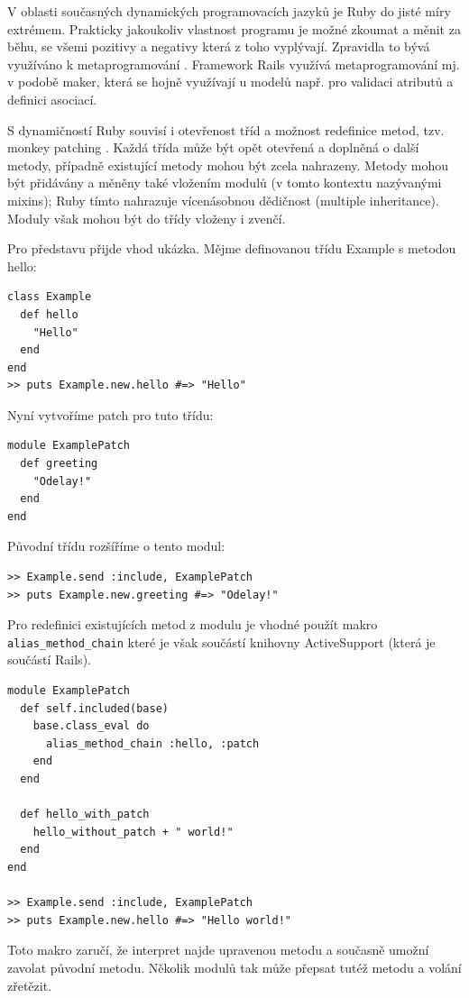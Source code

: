 \documentclass[thesis=B,czech]{FITthesis}[2012/05/02]
\begin{document}
V oblasti současných dynamických programovacích jazyků je Ruby do jisté
míry extrémem. Prakticky jakoukoliv vlastnost programu je možné zkoumat
a měnit za běhu, se všemi pozitivy a negativy která z toho vyplývají.
Zpravidla to bývá využíváno k metaprogramování \citep[3c]{why2008}.
Framework Rails využívá metaprogramování mj. v podobě maker, která se
hojně využívají u modelů např. pro validaci atributů a definici
asociací.

S dynamičností Ruby souvisí i otevřenost tříd a možnost redefinice
metod, tzv. monkey patching \citep[str. 293]{Olsen2011}. Každá třída
může být opět otevřená a doplněná o další metody, případně existující
metody mohou být zcela nahrazeny. Metody mohou být přidávány a měněny
také vložením modulů (v tomto kontextu nazývanými mixins); Ruby tímto
nahrazuje vícenásobnou dědičnost (multiple inheritance). Moduly však
mohou být do třídy vloženy i zvenčí.

Pro představu přijde vhod ukázka. Mějme definovanou třídu Example s
metodou hello:

\begin{lstlisting}
class Example
  def hello
    "Hello"
  end
end
>> puts Example.new.hello #=> "Hello"
\end{lstlisting}
Nyní vytvoříme patch pro tuto třídu:

\begin{lstlisting}
module ExamplePatch
  def greeting
    "Odelay!"
  end
end
\end{lstlisting}
Původní třídu rozšíříme o tento modul:

\begin{lstlisting}
>> Example.send :include, ExamplePatch
>> puts Example.new.greeting #=> "Odelay!"
\end{lstlisting}
Pro redefinici existujících metod z modulu je vhodné použít makro
\lstinline!alias_method_chain! které je však součástí knihovny
ActiveSupport (která je součástí Rails).

\begin{lstlisting}
module ExamplePatch
  def self.included(base)
    base.class_eval do
      alias_method_chain :hello, :patch
    end
  end

  def hello_with_patch
    hello_without_patch + " world!"
  end
end

>> Example.send :include, ExamplePatch
>> puts Example.new.hello #=> "Hello world!"
\end{lstlisting}
Toto makro zaručí, že interpret najde upravenou metodu a současně umožní
zavolat původní metodu. Několik modulů tak může přepsat tutéž metodu a
volání zřetězit.
\end{document}
